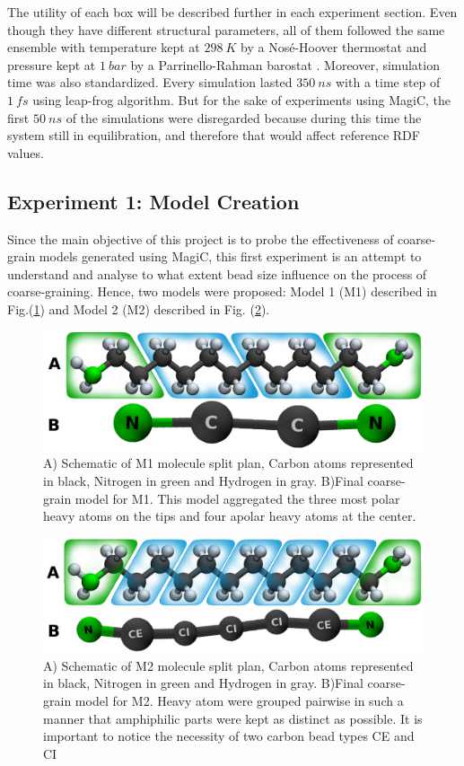 \documentclass[10pt,a4paper,twoside]{article}
\begin{document}
The utility of each box will be described further in each experiment section. Even though they have different structural parameters, all of them followed the same ensemble with temperature kept at $298\ K$ by a Nosé-Hoover thermostat \cite{nosetstat} and pressure kept at $1\ bar$ by a Parrinello-Rahman barostat \cite{prbstat}. Moreover, simulation time was also standardized. Every simulation lasted $350\ ns$ with a time step of $1\ fs$ using leap-frog algorithm. But for the sake of experiments using MagiC, the first $50\ ns$ of the simulations were disregarded because during this time the system still in equilibration, and therefore that would affect reference RDF values.


\subsection{Experiment 1: Model Creation}
 Since the main objective of this project is to probe the effectiveness of coarse-grain models generated using MagiC, this first experiment is an attempt to understand and analyse to what extent bead size influence on the process of coarse-graining. Hence, two models were proposed: Model 1 (M1) described in Fig.(\ref{Fig:mol1}) and Model 2 (M2) described in Fig. (\ref{Fig:mol2}).
 
 \begin{figure}[ht]
	\includegraphics[width=1.0 \textwidth]{./images/M1ab}
	\caption{A) Schematic of M1 molecule split plan, Carbon atoms represented in black, Nitrogen in green and Hydrogen in gray. B)Final coarse-grain model for M1. This model aggregated the three most polar heavy atoms on the tips and four apolar heavy atoms at the center.}
	\label{Fig:mol1}
\end{figure}
 \begin{figure}[ht]
	\includegraphics[width=1.0 \textwidth]{./images/M2ab}
	\caption{A) Schematic of M2 molecule split plan, Carbon atoms represented in black, Nitrogen in green and Hydrogen in gray. B)Final coarse-grain model for M2. Heavy atom were grouped pairwise in such a manner that amphiphilic parts were kept as distinct as possible. It is important to notice the necessity of two carbon bead types CE and CI}
		\label{Fig:mol2}
\end{figure}
 
\end{document}
